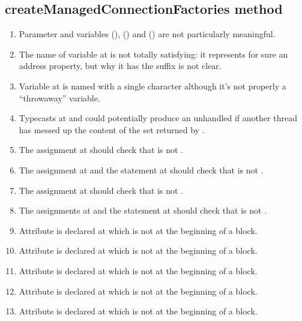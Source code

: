 \subsection{createManagedConnectionFactories method}
\begin{enumerate}
	\item {} Parameter  and variables  (),  () and  () are not particularly meaningful. 
	\item {} The name of variable  at  is not totally satisfying: it represents for sure an address property, but why it has the  suffix is not clear. 
	\item {} Variable  at  is named with a single character although it's not properly a “throwaway” variable. 
	\item {} Typecasts at  and  could potentially produce an unhandled  if another thread has messed up the content of the set returned by .
	\item {} The assignment at  should check that  is not . 
	\item {} The assignment at  and the  statement at  should check that  is not .
	\item {} The assignment at  should check that  is not .
	\item {} The assignments at  and the  statement at  should check that  is not .
	\item {} Attribute  is declared at  which is not at the beginning of a block. 
	\item {} Attribute  is declared at  which is not at the beginning of a block.
	\item {} Attribute  is declared at  which is not at the beginning of a block.
	\item {} Attribute  is declared at  which is not at the beginning of a block.
	\item {} Attribute  is declared at  which is not at the beginning of a block.

\end{enumerate}
